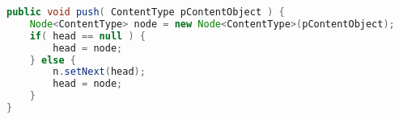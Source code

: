 \begin{lstlisting}[language=Java]
public void push( ContentType pContentObject ) {
	Node<ContentType> node = new Node<ContentType>(pContentObject);
	if( head == null ) {
		head = node;
	} else {
		n.setNext(head);
		head = node;
	}
}
\end{lstlisting}
